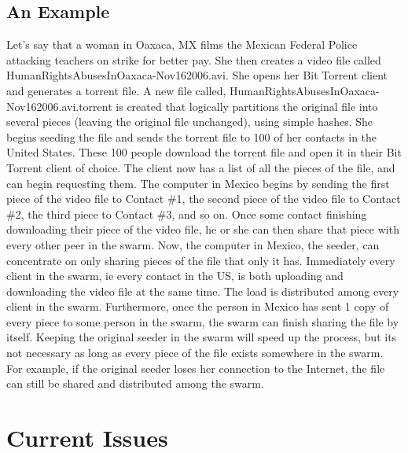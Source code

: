 \documentclass[a4paper,12pt]{report}
\begin{document}
\section{An Example}
Let's say that a woman in Oaxaca, MX films the Mexican Federal Police attacking teachers on strike for better pay.
She then creates a video file called HumanRightsAbusesInOaxaca-Nov162006.avi. She opens her Bit Torrent client and generates a torrent file.
A new file called, HumanRightsAbusesInOaxaca-Nov162006.avi.torrent is created that logically partitions the original file into several pieces (leaving the original file unchanged), using simple hashes.
She begins seeding the file and sends the torrent file to 100 of her contacts in the United States.
These 100 people download the torrent file and open it in their Bit Torrent client of choice.
The client now has a list of all the pieces of the file, and can begin requesting them.
The computer in Mexico begins by sending the first piece of the video file to Contact \#1, the second piece of the video file to Contact \#2, the third piece to Contact \#3, and so on.
Once some contact finishing downloading their piece of the video file, he or she can then share that piece with every other peer in the swarm.
Now, the computer in Mexico, the seeder, can concentrate on only sharing pieces of the file that only it has.
Immediately every client in the swarm, ie every contact in the US, is both uploading and downloading the video file at the same time.
The load is distributed among every client in the swarm.
Furthermore, once the person in Mexico has sent 1 copy of every piece to some person in the swarm, the swarm can finish sharing the file by itself.
Keeping the original seeder in the swarm will speed up the process, but its not necessary as long as every piece of the file exists somewhere in the swarm.
For example, if the original seeder loses her connection to the Internet, the file can still be shared and distributed among the swarm.

\chapter{Current Issues}
\end{document}
